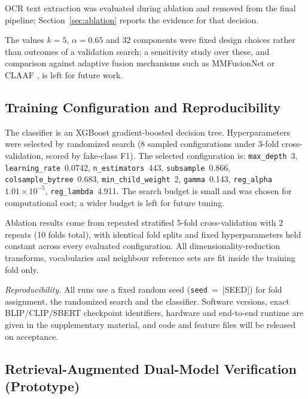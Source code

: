 \documentclass[conference,a4paper]{IEEEtran}
\begin{document}
OCR text extraction was evaluated during ablation and removed from the final
pipeline; Section~\ref{sec:ablation} reports the evidence for that decision.

The values $k=5$, $\alpha=0.65$ and 32 components were fixed design choices
rather than outcomes of a validation search; a sensitivity study over these,
and comparison against adaptive fusion mechanisms such as MMFusionNet
\cite{mmfusionnet} or CLAAF \cite{claaf}, is left for future work.

\subsection{Training Configuration and Reproducibility}

The classifier is an XGBoost gradient-boosted decision tree. Hyperparameters
were selected by randomized search (8 sampled configurations under 3-fold
cross-validation, scored by fake-class F1). The selected configuration is:
\texttt{max\_depth}~3, \texttt{learning\_rate}~0.0742,
\texttt{n\_estimators}~443, \texttt{subsample}~0.866,
\texttt{colsample\_bytree}~0.683, \texttt{min\_child\_weight}~2,
\texttt{gamma}~0.143, \texttt{reg\_alpha}~$1.01\times10^{-5}$,
\texttt{reg\_lambda}~4.911. The search budget is small and was chosen for
computational cost; a wider budget is left for future tuning.

Ablation results come from repeated stratified 5-fold cross-validation with
2 repeats (10 folds total), with identical fold splits and fixed
hyperparameters held constant across every evaluated configuration. All
dimensionality-reduction transforms, vocabularies and neighbour reference sets
are fit inside the training fold only.

\emph{Reproducibility.} All runs use a fixed random seed
(\texttt{seed}~=~[SEED]) for fold assignment, the randomized search and the
classifier. Software versions, exact BLIP/CLIP/SBERT checkpoint identifiers,
hardware and end-to-end runtime are given in the supplementary material, and
code and feature files will be released on acceptance.

\subsection{Retrieval-Augmented Dual-Model Verification (Prototype)}
\label{sec:verify}
\end{document}
